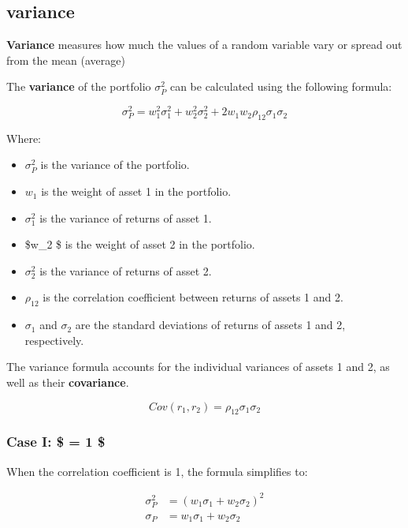 \documentclass[
]{book}
\providecommand{\tightlist}{%
  \setlength{\itemsep}{0pt}\setlength{\parskip}{0pt}}
\begin{document}
\hypertarget{variance}{%
\subsection{variance}\label{variance}}

\textbf{Variance} measures how much the values of a random variable vary
or spread out from the mean (average)

The \textbf{variance} of the portfolio \(\sigma_P^2\) can be calculated
using the following formula:

\[ \sigma_P^2 = w_1^2 \sigma_1^2 + w_2^2 \sigma_2^2 + 2w_1 w_2 \rho_{12} \sigma_1 \sigma_2 \]

Where:

\begin{itemize}
\tightlist
\item
  \(\sigma_P^2\) is the variance of the portfolio.
\item
  \(w_1\) is the weight of asset 1 in the portfolio.
\item
  \(\sigma_1^2\) is the variance of returns of asset 1.
\item
  \$w\_2 \$ is the weight of asset 2 in the portfolio.
\item
  \(\sigma_2^2\) is the variance of returns of asset 2.
\item
  \(\rho_{12}\) is the correlation coefficient between returns of assets
  1 and 2.
\item
  \(\sigma_1\) and \(\sigma_2\) are the standard deviations of returns
  of assets 1 and 2, respectively.
\end{itemize}

The variance formula accounts for the individual variances of assets 1
and 2, as well as their \textbf{covariance}.

\[Cov(r_1,r_2 )=\rho_{12} 𝜎_1 𝜎_2\]

\hypertarget{case-i-1}{%
\subsubsection{\texorpdfstring{Case I: \$ \rho = 1
\$}{Case I: \$ = 1 \$}}\label{case-i-1}}

When the correlation coefficient is 1, the formula simplifies to:

\[
\begin{aligned}
\sigma_P^2 &= (w_1 \sigma_1 + w_2 \sigma_2)^2 \\
\sigma_P  &= w_1 \sigma_1 + w_2 \sigma_2 \\
\end{aligned}
\]
\end{document}
